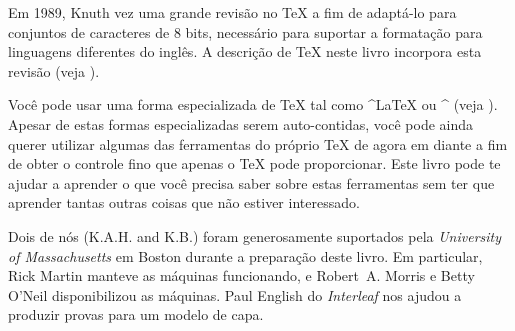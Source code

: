 Em 1989, Knuth vez uma grande revisão no \TeX{} a fim de adaptá-lo para
conjuntos de caracteres de $8$ bits, necessário para suportar a formatação para
linguagens diferentes do inglês. A descrição de \TeX{} neste livro incorpora
esta revisão (veja ).

{\tighten Você pode usar uma forma especializada de \TeX{} tal como ^{\LaTeX} ou
  ^{\AMSTeX} (veja ). Apesar de estas formas especializadas
  serem auto-contidas, você pode ainda querer utilizar algumas das ferramentas
  do próprio \TeX{} de agora em diante a fim de obter o controle fino que apenas
  o \TeX{} pode proporcionar. Este livro pode te ajudar a aprender o que você
  precisa saber sobre estas ferramentas sem ter que aprender tantas outras
  coisas que não estiver interessado. \par}

Dois de nós (K.A.H. and K.B.) foram generosamente suportados pela {\it
  University of Massachusetts} em Boston durante a preparação deste livro. Em
particular, Rick Martin manteve as máquinas funcionando, e Robert~A. Morris e
Betty O'Neil disponibilizou as máquinas.  Paul English do {\it Interleaf} nos
ajudou a produzir provas para um modelo de capa.

